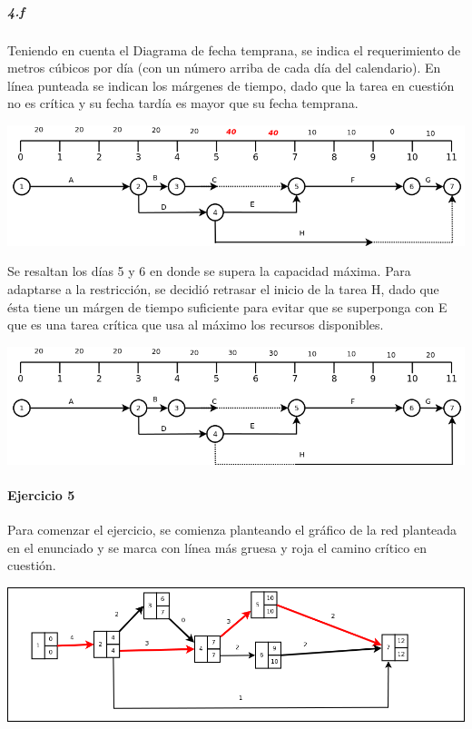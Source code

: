 \documentclass[a4paper,10pt]{article}
\begin{document}
  \subparagraph {4.f} Teniendo en cuenta el Diagrama de fecha temprana, se indica el requerimiento de metros cúbicos por día (con un número arriba de cada día del calendario). 
  En línea punteada se indican los márgenes de tiempo, dado que la tarea en cuestión no es crítica y su fecha tardía es mayor que su fecha temprana.
  
  \begin{center}
    \includegraphics[scale=0.55,keepaspectratio=true]{img/ej4-fechatemprana1.png} 
  \end{center}
  
  Se resaltan los días 5 y 6 en donde se supera la capacidad máxima. Para adaptarse a la restricción, se decidió retrasar el inicio de la tarea H, 
  dado que ésta tiene un márgen de tiempo suficiente para evitar que se superponga con E que es una tarea crítica que usa al máximo los recursos disponibles.
  \begin{center}
    \includegraphics[scale=0.55,keepaspectratio=true]{img/ej4-fechatemprana2.png} 
  \end{center}

  
  
\paragraph{Ejercicio 5}

Para comenzar el ejercicio, se comienza planteando el gr\'afico de la red planteada en el enunciado y se marca con l\'inea m\'as gruesa y roja el camino cr\'itico en cuesti\'on.

  \begin{center}
    \includegraphics[scale=0.4,keepaspectratio=true]{img/ej5-red.png} 
  \end{center}
\end{document}
